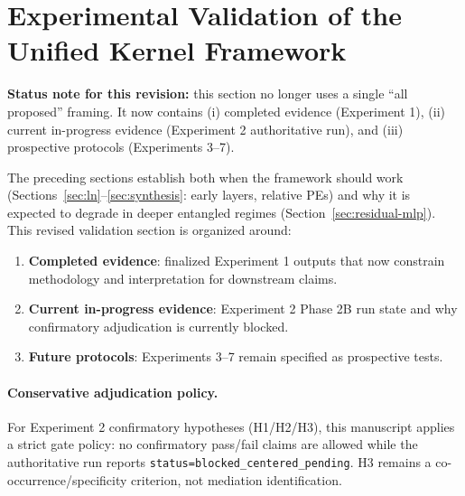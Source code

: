 \documentclass[11pt]{article}
\theoremstyle{definition}
\begin{document}
\section{Experimental Validation of the Unified Kernel Framework}
\label{sec:experiments}

\textbf{Status note for this revision:} this section no longer uses a single ``all proposed'' framing. It now contains (i) completed evidence (Experiment 1), (ii) current in-progress evidence (Experiment 2 authoritative run), and (iii) prospective protocols (Experiments 3--7).

The preceding sections establish both when the framework should work (Sections~\ref{sec:ln}--\ref{sec:synthesis}: early layers, relative PEs) and why it is expected to degrade in deeper entangled regimes (Section~\ref{sec:residual-mlp}). This revised validation section is organized around:
\begin{enumerate}
    \item \textbf{Completed evidence}: finalized Experiment 1 outputs that now constrain methodology and interpretation for downstream claims.
    \item \textbf{Current in-progress evidence}: Experiment 2 Phase 2B run state and why confirmatory adjudication is currently blocked.
    \item \textbf{Future protocols}: Experiments 3--7 remain specified as prospective tests.
\end{enumerate}

\paragraph{Conservative adjudication policy.}
For Experiment 2 confirmatory hypotheses (H1/H2/H3), this manuscript applies a strict gate policy: no confirmatory pass/fail claims are allowed while the authoritative run reports \texttt{status=blocked\_centered\_pending}. H3 remains a co-occurrence/specificity criterion, not mediation identification.
\end{document}
